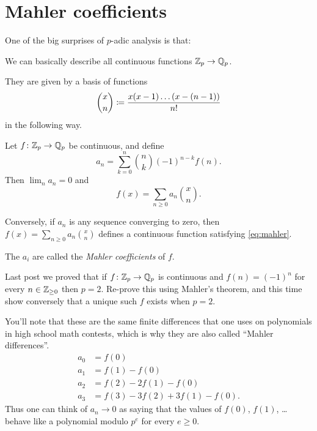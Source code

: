 %

\section{Mahler coefficients}
One of the big surprises of $p$-adic analysis is that:
\begin{moral}
	We can basically describe all continuous functions $\mathbb Z_p \to \mathbb Q_p$.
\end{moral}
They are given by a basis of functions
\[ \binom xn \coloneqq \frac{x(x-1) \dots (x-(n-1))}{n!} \]
in the following way.
\begin{theorem}
	Let $f \colon \mathbb Z_p \to \mathbb Q_p$ be continuous, and define
	\begin{equation}
		a_n = \sum_{k=0}^n \binom nk (-1)^{n-k} f(n).
		\label{eq:mahler}
	\end{equation}
	Then $\lim_n a_n = 0$ and \[ f(x) = \sum_{n \ge 0} a_n \binom xn. \]

	Conversely, if $a_n$ is any sequence converging to zero,
	then $f(x) = \sum_{n \ge 0} a_n \binom xn$
	defines a continuous function satisfying \eqref{eq:mahler}.
\end{theorem}
The $a_i$ are called the \emph{Mahler coefficients} of $f$.
\begin{exercise}
	Last post we proved that if $f \colon \mathbb Z_p \to \mathbb Q_p$ is continuous
	and $f(n) = (-1)^n$ for every $n \in \mathbb Z_{\ge 0}$ then $p = 2$.
	Re-prove this using Mahler's theorem,
	and this time show conversely that a unique such $f$ exists when $p=2$.
\end{exercise}

You'll note that these are the same finite differences that one
uses on polynomials in high school math contests,
which is why they are also called ``Mahler differences''.
\begin{align*}
	a_0 &= f(0) \\
	a_1 &= f(1) - f(0) \\
	a_2 &= f(2) - 2f(1) - f(0) \\
	a_3 &= f(3) - 3f(2) + 3f(1) - f(0).
\end{align*}
Thus one can think of $a_n \to 0$ as saying that
the values of $f(0)$, $f(1)$, \dots behave like a polynomial modulo $p^e$
for every $e \ge 0$.

